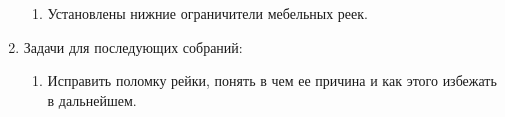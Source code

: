 \begin{enumerate}
\begin{enumerate}
      \item Установлены нижние ограничители мебельных реек.\newline
      
    \end{enumerate}
    
	\item Задачи для последующих собраний:\newline
	\begin{enumerate}
	  \item Исправить поломку рейки, понять в чем ее причина и как этого избежать в дальнейшем.\newline
	  
    \end{enumerate}     
\end{enumerate}

\fillpage
